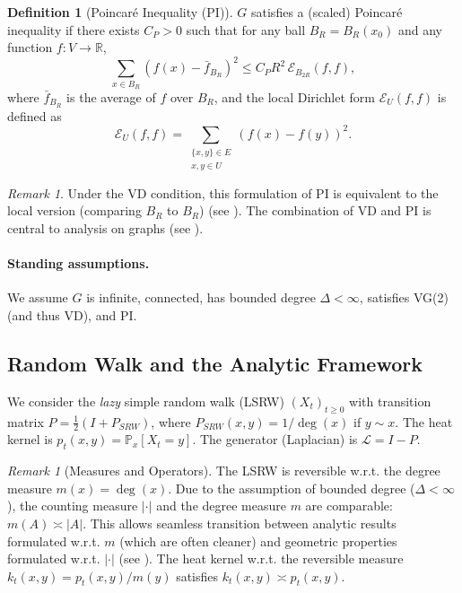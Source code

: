 \documentclass[12pt]{amsart}
\theoremstyle{definition}
\newtheorem{definition}[theorem]{Definition}
\theoremstyle{remark}
\newtheorem{remark}[theorem]{Remark}
\newcommand{\cE}{\mathcal{E}} %
\newcommand{\LL}{\mathcal{L}} %
\newcommand{\R}{\mathbb{R}}
\newcommand{\Prob}{\mathbb{P}}
\begin{document}
\begin{definition}[Poincaré Inequality (PI)]\label{def:PI}
$G$ satisfies a (scaled) Poincaré inequality if there exists $C_P > 0$ such that for any ball $B_R=B_R(x_0)$ and any function $f: V \to \R$,
\[
\sum_{x \in B_R} (f(x) - \bar{f}_{B_R})^2 \leq C_P R^2 \, \cE_{B_{2R}}(f,f),
\]
where $\bar{f}_{B_R}$ is the average of $f$ over $B_R$, and the local Dirichlet form $\cE_U(f,f)$ is defined as
\[
\cE_U(f,f) = \sum_{\substack{\{x,y\} \in E \\ x,y \in U}} (f(x)-f(y))^2.
\]
\end{definition}

\begin{remark}\label{rem:PI_equivalence}
Under the VD condition, this formulation of PI is equivalent to the local version (comparing $B_R$ to $B_R$) (see \cite{HajlaszKoskela00}). The combination of VD and PI is central to analysis on graphs (see \cite{GrigoryanTelcs12}).
\end{remark}

\paragraph{Standing assumptions.} We assume $G$ is infinite, connected, has bounded degree $\Delta < \infty$, satisfies VG(2) (and thus VD), and PI.

\subsection{Random Walk and the Analytic Framework}
We consider the \emph{lazy} simple random walk (LSRW) $(X_t)_{t \geq 0}$ with transition matrix $P = \frac{1}{2}(I + P_{SRW})$, where $P_{SRW}(x,y) = 1/\deg(x)$ if $y \sim x$. The heat kernel is $p_t(x,y) = \Prob_x[X_t = y]$. The generator (Laplacian) is $\LL = I - P$.

\begin{remark}[Measures and Operators]\label{rem:measures_operators}
The LSRW is reversible w.r.t. the degree measure $m(x)=\deg(x)$. Due to the assumption of bounded degree ($\Delta < \infty$), the counting measure $|\cdot|$ and the degree measure $m$ are comparable: $m(A) \asymp |A|$. This allows seamless transition between analytic results formulated w.r.t. $m$ (which are often cleaner) and geometric properties formulated w.r.t. $|\cdot|$ (see \cite{Coulhon03}). The heat kernel w.r.t. the reversible measure $k_t(x,y) = p_t(x,y)/m(y)$ satisfies $k_t(x,y) \asymp p_t(x,y)$.
\end{remark}
\end{document}
